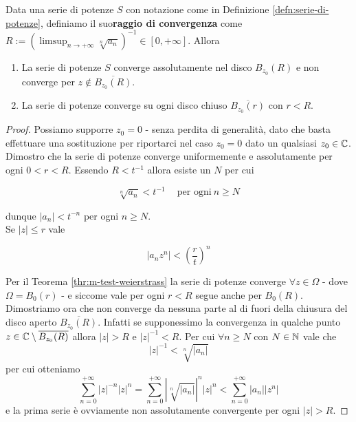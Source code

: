 \begin{theorem}
	\label{thr:criterio-hadamard}
	Data una serie di potenze $S$ con notazione come in Definizione \ref{defn:serie-di-potenze}, definiamo il suo\textbf{raggio di convergenza} come $R := ( \limsup_{n\to+\infty} \sqrt[n]{a_n})^{-1} \in \left[0,+\infty\right]$. Allora 
	\begin{enumerate}
		\item La serie di potenze $S$ converge assolutamente nel disco $B_{z_0}(R)$ e non converge per $z \notin \overline{B_{z_0}(R)}$.
		\item La serie di potenze converge su ogni disco chiuso $\overline{B_{z_0}(r)}$ con $r < R$.  
	\end{enumerate}
\end{theorem}
\begin{proof}
	Possiamo supporre $z_0 = 0$ - senza perdita di generalità, dato che basta effettuare una sostituzione per riportarci nel caso $z_0 = 0$ dato un qualsiasi $z_0 \in \mathbb{C}$.\\ 
	Dimostro che la serie di potenze converge uniformemente e assolutamente per ogni $0 < r < R$. Essendo $R < t^{-1}$ allora esiste un $N$ per cui
	
		$$\sqrt[n]{a_n} < t^{-1} \quad\ \text{per ogni}\ n \ge N $$
	
	dunque $|a_n| < t^{-n}$ per ogni $n \ge N$. \\ Se $|z| \le r$ vale
	
	$$	|a_nz^n| < \left(\frac{r}{t}\right)^n$$
	
	Per il Teorema \ref{thr:m-test-weierstrass} la serie di potenze converge $\forall z \in \Omega$ - dove $\Omega = B_0(r)$ - e siccome vale per ogni $r < R$ segue anche per $B_0(R)$.\\
	
	Dimostriamo ora che non converge da nessuna parte al di fuori della chiusura del disco aperto $\overline{B_{z_0}(R)}$. Infatti se supponessimo la convergenza in qualche punto $z \in \mathbb{C} \setminus \overline{B_{z_0}(R)}$ allora $|z| > R$ e $|z|^{-1} < R$. Per cui $\forall n \ge N$ con $N \in \mathbb{N}$ vale che
		$$|z|^{-1} < \sqrt[n]{|a_n|}$$
	per cui otteniamo 
	$$	\sum^{+\infty}_{n=0}|z|^{-n}|z|^n = \sum^{+\infty}_{n=0}|\sqrt[n]{|a_n|}|^n|z|^n < \sum^{+\infty}_{n=0}|a_n||z^n| $$
	e la prima serie è ovviamente non assolutamente convergente per ogni $|z| > R$.
\end{proof}


